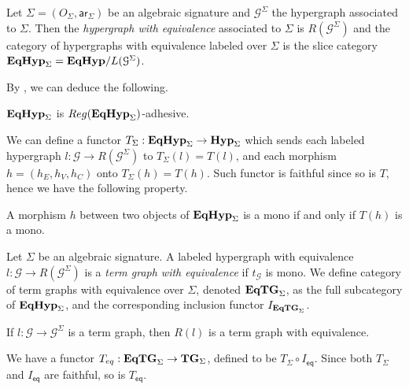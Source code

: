 \documentclass[a4paper,UKenglish,cleveref,pdftex,thm-restate,numberwithinsect]{lipics-v2021}
\newcommand{\eq}{\mathsf{eq}}
\newcommand{\catname}[1]{\textbf{\textup{#1}}}
\newcommand{\hyp}{\catname{Hyp}}
\newcommand{\hyps}{\catname{Hyp}_{\Sigma}}
\newcommand{\EqHyp}{\catname{EqHyp}} %
\newcommand{\EqHyps}{\catname{EqHyp}_{\Sigma}}
\newcommand{\EqTG}{\catname{EqTG}}
\newcommand{\EqTGs}{\catname{EqTG}_{\Sigma}}
\newcommand{\tg}[0]{\catname{TG}_{\Sigma}}
\newcommand{\ari}{\mathsf{ar}}
\newcommand{\reg}{\mathsf{Reg}}
\begin{document}
\begin{definition}
	Let $\Sigma = (O_\Sigma, \ari_\Sigma)$ be an algebraic signature and $\mathcal{G}^{\Sigma}$ the hypergraph associated to $\Sigma$.
	Then the \emph{hypergraph with equivalence} associated to $\Sigma$ is $R(\mathcal{G}^\Sigma)$ and the category of hypergraphs with 
	equivalence labeled over $\Sigma$ is the 
	slice category $\EqHyp_\Sigma = \EqHyp/L(\mathcal{G}^\Sigma)$.
\end{definition}

By , we can deduce the following.

\begin{proposition}
	$\EqHyp_\Sigma$ is $\reg (\EqHyp_\Sigma)$-adhesive.
\end{proposition}


We can define a functor $T_\Sigma: \EqHyps \to \hyps$ which sends each labeled hypergraph $l: \mathcal{G} \to R(\mathcal{G}^\Sigma)$ to $T_\Sigma(l) = T(l)$, and each morphism $h = (h_E, h_V, h_C)$ onto $T_\Sigma(h) = T(h)$. Such functor is faithful since so is $T$, hence we have the following property.

\begin{proposition}\label{prop:monos_in_eqhyps}
	A morphism $h$ between two objects of $\EqHyps$ is a mono if and only if $T(h)$ is a mono.
\end{proposition}


\begin{definition}
	Let $\Sigma$ be an algebraic signature.
	A labeled hypergraph with equivalence $l: \mathcal{G} \to R(\mathcal{G}^\Sigma)$ is a \emph{term graph with equivalence} if $t_{\mathcal{G}}$ is mono.
	We define category of term graphs with equivalence over $\Sigma$, denoted $\EqTG_{\Sigma}$, as the full subcategory of $\EqHyp_\Sigma$,
	and the corresponding inclusion functor $I_{\EqTG_\Sigma}$.
\end{definition}

\begin{proposition}
	If $l: \mathcal{G \to G}^\Sigma$ is a term graph, then $R(l)$ is a term graph with equivalence.
\end{proposition}

We have a functor $T_{\eq} : \EqTGs \to \tg$, defined to be $T_\Sigma \circ I_\eq$. Since both $T_\Sigma$ and $I_\eq$ are faithful, so is $T_\eq$.
\end{document}

